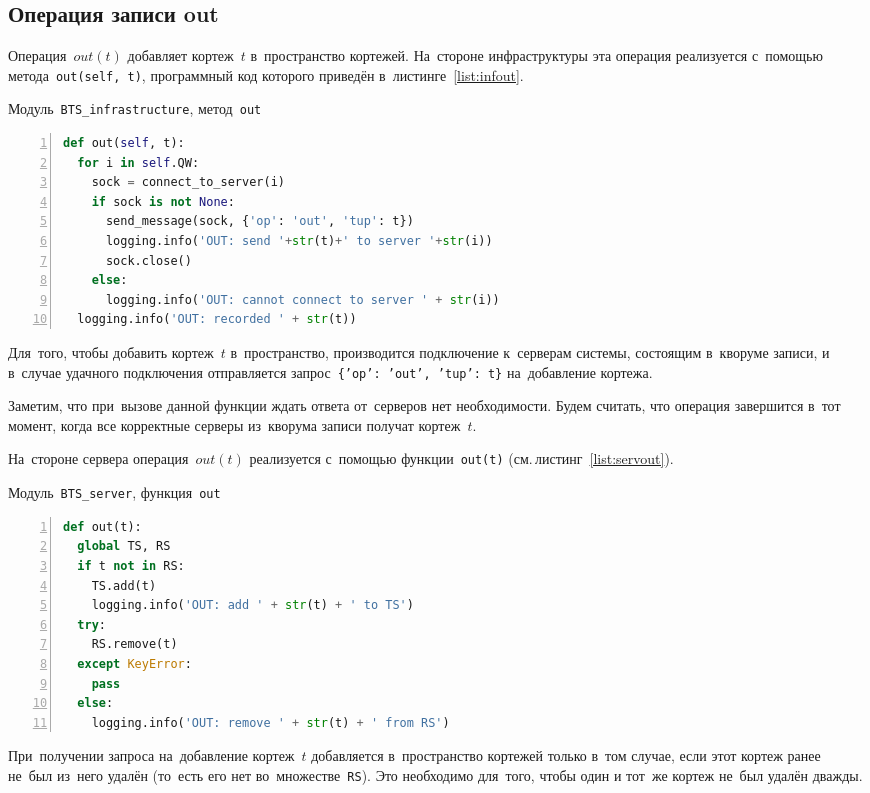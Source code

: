 \subsection{Операция записи out}\label{subsec:6}
Операция~$out(t)$ добавляет кортеж~$t$ в~пространство кортежей. На~стороне инфраструктуры эта операция реализуется с~помощью метода~\texttt{out(self, t)}, программный код которого приведён в~листинге~\ref{list:infout}.
\begin{ListingEnv}\caption{Модуль~\texttt{BTS\_infrastructure}, метод~\texttt{out}}\label{list:infout}
	\begin{lstlisting}[language=Python, numbers=left]
def out(self, t):
  for i in self.QW:
    sock = connect_to_server(i)
    if sock is not None:
      send_message(sock, {'op': 'out', 'tup': t})
      logging.info('OUT: send '+str(t)+' to server '+str(i))
      sock.close()
    else:
      logging.info('OUT: cannot connect to server ' + str(i))
  logging.info('OUT: recorded ' + str(t))
	\end{lstlisting}
\end{ListingEnv}
Для~того, чтобы добавить кортеж~$t$ в~пространство, производится подключение к~серверам системы, состоящим в~кворуме записи, и в~случае удачного подключения отправляется запрос~\texttt{\{'op': 'out', 'tup': t\}} на~добавление кортежа.

Заметим, что при~вызове данной функции ждать ответа от~серверов нет необходимости. Будем считать, что операция завершится в~тот момент, когда все корректные серверы из~кворума записи получат кортеж~$t$.

На~стороне сервера операция~$out(t)$ реализуется с~помощью функции~\texttt{out(t)} (см.\,листинг~\ref{list:servout}).
\begin{ListingEnv}\caption{Модуль~\texttt{BTS\_server}, функция~\texttt{out}}\label{list:servout}
	\begin{lstlisting}[language=Python, numbers=left]
def out(t):
  global TS, RS
  if t not in RS:
    TS.add(t)
    logging.info('OUT: add ' + str(t) + ' to TS')
  try:
    RS.remove(t)
  except KeyError:
    pass
  else:
    logging.info('OUT: remove ' + str(t) + ' from RS')
	\end{lstlisting}
\end{ListingEnv}
При~получении запроса на~добавление кортеж~$t$ добавляется в~пространство кортежей только в~том случае, если этот кортеж ранее не~был из~него удалён (то~есть его нет во~множестве~\texttt{RS}). Это необходимо для~того, чтобы один и тот~же кортеж не~был удалён дважды.


